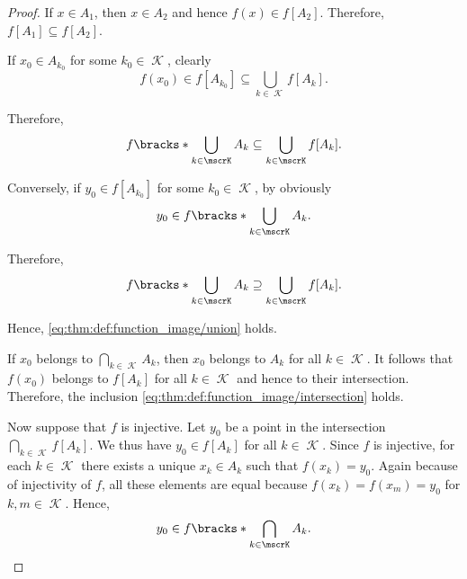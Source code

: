 \begin{proof}
   If \( x \in A_1 \), then \( x \in A_2 \) and hence \( f(x) \in f[A_2] \). Therefore, \( f[A_1] \subseteq f[A_2] \).

   If \( x_0 \in A_{k_0} \) for some \( k_0 \in \mscrK \), clearly
  \begin{equation*}
    f(x_0) \in f[A_{k_0}] \subseteq \bigcup_{k \in \mscrK} f[A_k].
  \end{equation*}

  Therefore,
  \begin{equation*}
    f\bracks*{ \bigcup_{k \in \mscrK} A_k } \subseteq \bigcup_{k \in \mscrK} f[A_k].
  \end{equation*}

  Conversely, if \( y_0 \in f[A_{k_0}] \) for some \( k_0 \in \mscrK \), by  obviously
  \begin{equation*}
    y_0 \in f\bracks*{ \bigcup_{k \in \mscrK} A_k }.
  \end{equation*}

  Therefore,
  \begin{equation*}
    f\bracks*{ \bigcup_{k \in \mscrK} A_k } \supseteq \bigcup_{k \in \mscrK} f[A_k].
  \end{equation*}

  Hence, \eqref{eq:thm:def:function_image/union} holds.

   If \( x_0 \) belongs to \( \bigcap_{k \in \mscrK} A_k \), then \( x_0 \) belongs to \( A_k \) for all \( k \in \mscrK \). It follows that \( f(x_0) \) belongs to \( f[A_k] \) for all \( k \in \mscrK \) and hence to their intersection. Therefore, the inclusion \eqref{eq:thm:def:function_image/intersection} holds.

  Now suppose that \( f \) is injective. Let \( y_0 \) be a point in the intersection \( \bigcap_{k \in \mscrK} f[A_k] \). We thus have \( y_0 \in f[A_k] \) for all \( k \in \mscrK \). Since \( f \) is injective, for each \( k \in \mscrK \) there exists a unique \( x_k \in A_k \) such that \( f(x_k) = y_0 \). Again because of injectivity of \( f \), all these elements are equal because \( f(x_k) = f(x_m) = y_0 \) for \( k, m \in \mscrK \). Hence,
  \begin{equation*}
    y_0 \in f\bracks*{ \bigcap_{k \in \mscrK} A_k }.
  \end{equation*}


\end{proof}
